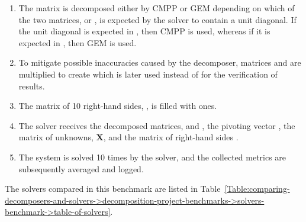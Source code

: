 \begin{enumerate}
	\itemsep=0em %
	\item The matrix is decomposed either by CMPP or GEM depending on which of the two matrices,  or , is expected by the solver to contain a unit diagonal. If the unit diagonal is expected in , then CMPP is used, whereas if it is expected in , then GEM is used.
	\item To mitigate possible inaccuracies caused by the decomposer, matrices  and  are multiplied to create  which is later used instead of  for the verification of results.
	\item The matrix of 10 right-hand sides, , is filled with ones.
	\item The solver receives the decomposed matrices,  and , the pivoting vector , the matrix of unknowns, $\mathbf{X}$, and the matrix of right-hand sides .
	\item The system is solved 10 times by the solver, and the collected metrics are subsequently averaged and logged.
\end{enumerate}

The solvers compared in this benchmark are listed in Table~\ref{Table:comparing-decomposers-and-solvers->decomposition-project-benchmarks->solvers-benchmark->table-of-solvers}.

